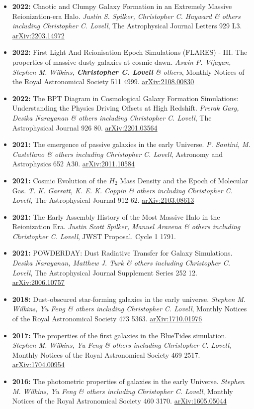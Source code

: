 \begin{itemize}
\item \textbf{2022:} Chaotic and Clumpy Galaxy Formation in an Extremely Massive Reionization-era Halo. \textit{Justin S. Spilker, Christopher C. Hayward \& others including Christopher C. Lovell}, The Astrophysical Journal Letters 929 L3. \href{https://arxiv.org/abs/2203.14972}{arXiv:2203.14972}
\item \textbf{2022:} First Light And Reionisation Epoch Simulations (FLARES) - III. The properties of massive dusty galaxies at cosmic dawn. \textit{Aswin P. Vijayan, Stephen M. Wilkins, \textbf{Christopher C. Lovell} \& others}, Monthly Notices of the Royal Astronomical Society 511 4999. \href{https://arxiv.org/abs/2108.00830}{arXiv:2108.00830}
\item \textbf{2022:} The BPT Diagram in Cosmological Galaxy Formation Simulations: Understanding the Physics Driving Offsets at High Redshift. \textit{Prerak Garg, Desika Narayanan \& others including Christopher C. Lovell}, The Astrophysical Journal 926 80. \href{https://arxiv.org/abs/2201.03564}{arXiv:2201.03564}
\item \textbf{2021:} The emergence of passive galaxies in the early Universe. \textit{P. Santini, M. Castellano \& others including Christopher C. Lovell}, Astronomy and Astrophysics 652 A30. \href{https://arxiv.org/abs/2011.10584}{arXiv:2011.10584}
\item \textbf{2021:} Cosmic Evolution of the $H_{2}$ Mass Density and the Epoch of Molecular Gas. \textit{T. K. Garratt, K. E. K. Coppin \& others including Christopher C. Lovell}, The Astrophysical Journal 912 62. \href{https://arxiv.org/abs/2103.08613}{arXiv:2103.08613}
\item \textbf{2021:} The Early Assembly History of the Most Massive Halo in the Reionization Era. \textit{Justin Scott Spilker, Manuel Aravena \& others including Christopher C. Lovell}, JWST Proposal. Cycle 1 1791.
\item \textbf{2021:} POWDERDAY: Dust Radiative Transfer for Galaxy Simulations. \textit{Desika Narayanan, Matthew J. Turk \& others including Christopher C. Lovell}, The Astrophysical Journal Supplement Series 252 12. \href{https://arxiv.org/abs/2006.10757}{arXiv:2006.10757}
\item \textbf{2018:} Dust-obscured star-forming galaxies in the early universe. \textit{Stephen M. Wilkins, Yu Feng \& others including Christopher C. Lovell}, Monthly Notices of the Royal Astronomical Society 473 5363. \href{https://arxiv.org/abs/1710.01976}{arXiv:1710.01976}
\item \textbf{2017:} The properties of the first galaxies in the BlueTides simulation. \textit{Stephen M. Wilkins, Yu Feng \& others including Christopher C. Lovell}, Monthly Notices of the Royal Astronomical Society 469 2517. \href{https://arxiv.org/abs/1704.00954}{arXiv:1704.00954}
\item \textbf{2016:} The photometric properties of galaxies in the early Universe. \textit{Stephen M. Wilkins, Yu Feng \& others including Christopher C. Lovell}, Monthly Notices of the Royal Astronomical Society 460 3170. \href{https://arxiv.org/abs/1605.05044}{arXiv:1605.05044}
\end{itemize}

